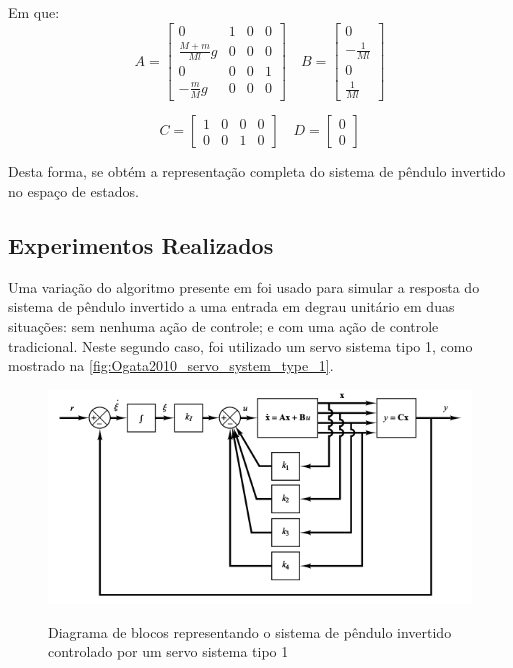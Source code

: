 Em que:
\[
	A = 
	\begin{bmatrix}
		0 & 1 & 0 & 0 \\
		\frac{M+m}{Ml}g & 0 & 0 & 0 \\
		0 & 0 & 0 & 1 \\
		-\frac{m}{M}g & 0 & 0 & 0
	\end{bmatrix}\quad
	B = 
	\begin{bmatrix}
		0 \\
		-\frac{1}{Ml} \\
		0 \\
		\frac{1}{Ml}
	\end{bmatrix}
\]

\[
	C = 
		\begin{bmatrix}
			1 & 0 & 0 & 0 \\
			0 & 0 & 1 & 0
		\end{bmatrix}\quad
	D = 
		\begin{bmatrix}
			0 \\
			0
		\end{bmatrix}
\]

Desta forma, se obtém a representação completa do sistema de pêndulo invertido no espaço de estados.

\subsection{Experimentos Realizados}
\label{subsec:metodolgoia-pendulum-experimentos}

Uma variação do algoritmo presente em \cite[p.~750]{Ogata2010} foi usado para simular a resposta do sistema de pêndulo invertido a uma entrada em degrau unitário em duas situações: sem nenhuma ação de controle; e com uma ação de controle tradicional. Neste segundo caso, foi utilizado um servo sistema tipo 1, como mostrado na \autoref{fig:Ogata2010_servo_system_type_1}.

\begin{figure}[!htb]
    \centering
    \caption{Diagrama de blocos representando o sistema de pêndulo invertido controlado por um servo sistema tipo 1}
    \includegraphics[width=1\textwidth]{./04-figuras/Ogata2010_servo_system_type_1}
    \label{fig:Ogata2010_servo_system_type_1}
\end{figure}

